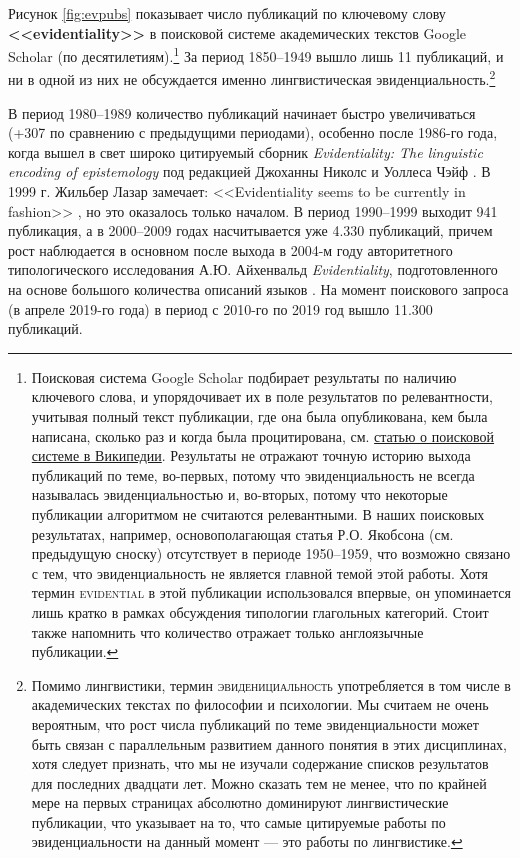 Рисунок \ref{fig:evpubs} показывает число публикаций по ключевому слову \textbf{<<evidentiality>>} в поисковой системе академических текстов Google Scholar (по десятилетиям).\footnote{Поисковая система Google Scholar подбирает результаты по наличию ключевого слова, и упорядочивает их в поле результатов по релевантности, учитывая полный текст публикации, где она была опубликована, кем была написана, сколько раз и когда была процитирована, см. \href{https://en.wikipedia.org/wiki/Google_Scholar}{статью о поисковой системе в Википедии}. Результаты не отражают точную историю выхода публикаций по теме, во-первых, потому что эвиденциальность не всегда называлась эвиденциальностью и, во-вторых, потому что некоторые публикации алгоритмом не считаются релевантными. В наших поисковых результатах, например, основополагающая статья Р.О. Якобсона (см. предыдущую сноску) отсутствует в периоде 1950--1959, что возможно связано с тем, что эвиденциальность не является главной темой этой работы. Хотя термин \textsc{evidential} в этой публикации использовался впервые, он упоминается лишь кратко в рамках обсуждения типологии глагольных категорий. Стоит также напомнить что количество отражает только англоязычные публикации.} За период 1850--1949 вышло лишь 11 публикаций, и ни в одной из них не обсуждается именно лингвистическая эвиденциальность.\footnote{Помимо лингвистики, термин \textsc{эвиденициальность} употребляется в том числе в академических текстах по философии и психологии. Мы считаем не очень вероятным, что рост числа публикаций по теме эвиденциальности может быть связан с параллельным развитием данного понятия в этих дисциплинах, хотя следует признать, что мы не изучали содержание списков результатов для последних двадцати лет. Можно сказать тем не менее, что по крайней мере на первых страницах абсолютно доминируют лингвистические публикации, что указывает на то, что самые цитируемые работы по эвиденциальности на данный момент --- это работы по лингвистике.}
\par В период 1980--1989 количество публикаций начинает быстро увеличиваться (+307 по сравнению с предыдущими периодами), особенно после 1986-го года, когда вышел в свет широко цитируемый сборник \textit{Evidentiality: The linguistic encoding of epistemology} под редакцией Джоханны Николс и Уоллеса Чэйф \citep{chafenichols1986}. В 1999 г. Жильбер Лазар замечает: <<Evidentiality seems to be currently in fashion>> \citep[91]{lazard1999}, но это оказалось только началом. В период 1990--1999 выходит 941 публикация, а в 2000--2009 годах насчитывается уже 4.330 публикаций, причем рост наблюдается в основном после выхода в 2004-м году авторитетного типологического исследования А.Ю. Айхенвальд \textit{Evidentiality}, подготовленного на основе большого количества описаний языков \citep{aikhenvald2004}. На момент поискового запроса (в апреле 2019-го года) в период с 2010-го по 2019 год вышло 11.300 публикаций.
